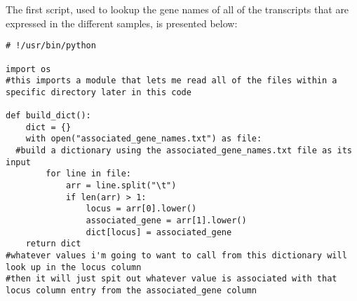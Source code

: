 \documentclass[12pt]{article}
\begin{document}
    The first script, used to lookup the gene names of all of the transcripts that are expressed in the different samples, is presented below:
	\begin{mdframed}[backgroundcolor=light-gray, roundcorner=10pt,leftmargin=1, rightmargin=1, innerleftmargin=15, innertopmargin=15,innerbottommargin=15, outerlinewidth=1, linecolor=light-gray]
\begin{lstlisting}
# !/usr/bin/python

import os
#this imports a module that lets me read all of the files within a specific directory later in this code

def build_dict():
    dict = {}
    with open("associated_gene_names.txt") as file:
  #build a dictionary using the associated_gene_names.txt file as its input
        for line in file:
            arr = line.split("\t")
            if len(arr) > 1:
                locus = arr[0].lower()
                associated_gene = arr[1].lower() 
                dict[locus] = associated_gene
    return dict   
#whatever values i'm going to want to call from this dictionary will look up in the locus column
#then it will just spit out whatever value is associated with that locus column entry from the associated_gene column 


\end{lstlisting}
\end{mdframed}
\end{document}
